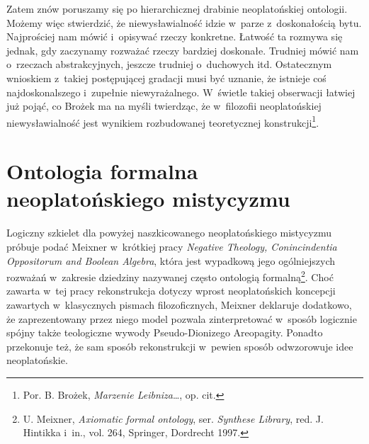 Zatem znów poruszamy się po hierarchicznej drabinie neoplatońskiej ontologii. Możemy więc stwierdzić, że niewysławialność idzie w~parze z~doskonałością bytu. Najprościej nam mówić i~opisywać rzeczy konkretne. Łatwość ta rozmywa się jednak, gdy zaczynamy rozważać rzeczy bardziej doskonałe. Trudniej mówić nam o~rzeczach abstrakcyjnych, jeszcze trudniej o~duchowych itd. Ostatecznym wnioskiem z~takiej postępującej gradacji musi być uznanie, że istnieje coś najdoskonalszego i~zupełnie niewyrażalnego. W~świetle takiej obserwacji łatwiej już pojąć, co Brożek ma na myśli twierdząc, że w~filozofii neoplatońskiej niewysławialność jest wynikiem rozbudowanej teoretycznej konstrukcji\footnote{Por. B. Brożek, \textit{Marzenie Leibniza}\ldots, op. cit.}.




\chapter{Ontologia formalna neoplatońskiego mistycyzmu}\label{neopl-alg}

Logiczny szkielet dla powyżej naszkicowanego neoplatońskiego mistycyzmu próbuje podać Meixner w~krótkiej pracy \textit{Negative Theology, Conincindentia Oppositorum and Boolean Algebra}, która jest wypadkową jego ogólniejszych rozważań w~zakresie dziedziny nazywanej często ontologią formalną\footnote{U. Meixner, \textit{Axiomatic formal ontology}, ser. \textit{Synthese Library}, red. J. Hintikka i~in., vol. 264, Springer, Dordrecht 1997.}. Choć zawarta w~tej pracy rekonstrukcja dotyczy wprost neoplatońskich koncepcji zawartych w~klasycznych pismach filozoficznych, Mei\-xner deklaruje dodatkowo, że zaprezentowany przez niego model pozwala zinterpretować w~sposób logicznie spójny także teologiczne wywody Pseudo-Dionizego Areopagity. Ponadto przekonuje też, że sam sposób rekonstrukcji w~pewien sposób odwzorowuje idee neoplatońskie.

